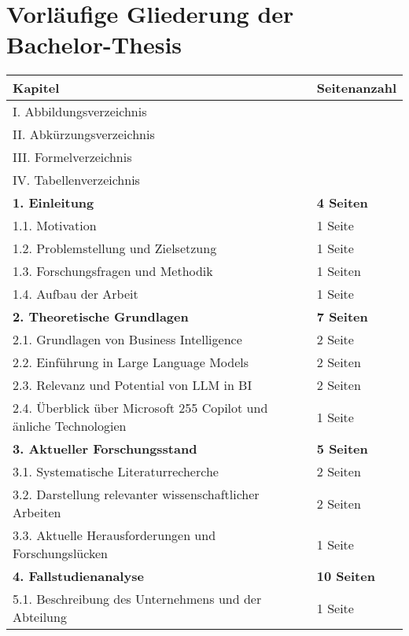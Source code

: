 
\section{Vorläufige Gliederung der Bachelor-Thesis}


\begin{longtable}{|p{9cm}|p{2.5cm}|}
    \hline
    \textbf{Kapitel} & \textbf{Seitenanzahl} \\
    \hline
    I.      Abbildungsverzeichnis & \\
    \hline
    II.     Abkürzungsverzeichnis & \\
    \hline
    III.    Formelverzeichnis & \\
    \hline
    IV.     Tabellenverzeichnis & \\
    \hline
    \textbf{1. Einleitung} & \textbf{4 Seiten} \\
    \hline
        1.1. Motivation & 1 Seite \\
        \hline
        1.2. Problemstellung und Zielsetzung & 1 Seite \\
        \hline
        1.3. Forschungsfragen und Methodik & 1 Seiten \\
        \hline
        1.4. Aufbau der Arbeit & 1 Seite \\
    \hline
    \textbf{2. Theoretische Grundlagen} & \textbf{7 Seiten} \\
    \hline
        2.1. Grundlagen von Business Intelligence & 2 Seite \\
        \hline
        2.2. Einführung in Large Language Models & 2 Seiten \\
        \hline
        2.3. Relevanz und Potential von LLM in BI & 2 Seiten \\
        \hline
        2.4. Überblick über Microsoft 255 Copilot und änliche Technologien & 1 Seite \\
    \hline
    \textbf{3. Aktueller Forschungsstand} & \textbf{5 Seiten} \\
    \hline
        3.1. Systematische Literaturrecherche & 2 Seiten \\
        \hline
        3.2. Darstellung relevanter wissenschaftlicher Arbeiten & 2 Seiten \\
        \hline
        3.3. Aktuelle Herausforderungen und Forschungslücken & 1 Seite \\
    \hline
    \textbf{4. Fallstudienanalyse} & \textbf{10 Seiten} \\
    \hline
        5.1. Beschreibung des Unternehmens und der Abteilung & 1 Seite \\

\end{longtable}
